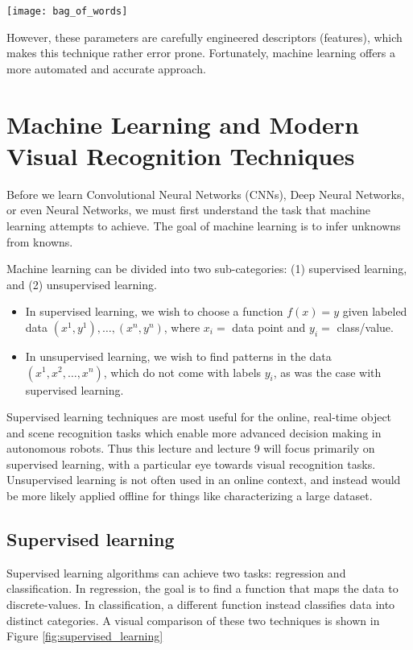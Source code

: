 \documentclass[twoside]{article}
\begin{document}
\begin{center}
	\texttt{[image: bag\_of\_words]}
\end{center}

However, these parameters are carefully engineered descriptors (features), which makes this technique rather error prone. Fortunately, machine learning offers a more automated and accurate approach.

\section{Machine Learning and Modern Visual Recognition Techniques}

Before we learn Convolutional Neural Networks (CNNs), Deep Neural Networks, or even Neural Networks, we must first understand the task that machine learning attempts to achieve. The goal of machine learning is to infer unknowns from knowns.

Machine learning can be divided into two sub-categories: (1) supervised learning, and (2) unsupervised learning.

\begin{itemize}
\item In supervised learning, we wish to choose a function $f(x) = y$ given labeled data $(x^1, y^1), \dots, (x^n, y^n)$, where $x_i =$ data point and $y_i =$ class/value.

\item In unsupervised learning, we wish to find patterns in the data $(x^1, x^2, \dots, x^n)$, which do not come with labels $y_i$, as was the case with supervised learning.
\end{itemize}

Supervised learning techniques are most useful for the online, real-time object and scene recognition tasks which enable more advanced decision making in autonomous robots. Thus this lecture and lecture 9 will focus primarily on supervised learning, with a particular eye towards visual recognition tasks. Unsupervised learning is not often used in an online context, and instead would be more likely applied offline for things like characterizing a large dataset. 

\subsection{Supervised learning}

Supervised learning algorithms can achieve two tasks: regression and classification. In regression, the goal is to find a function that maps the data to discrete-values. In classification, a different function instead classifies data into distinct categories. A visual comparison of these two techniques is shown in Figure \ref{fig:supervised_learning}
\end{document}
